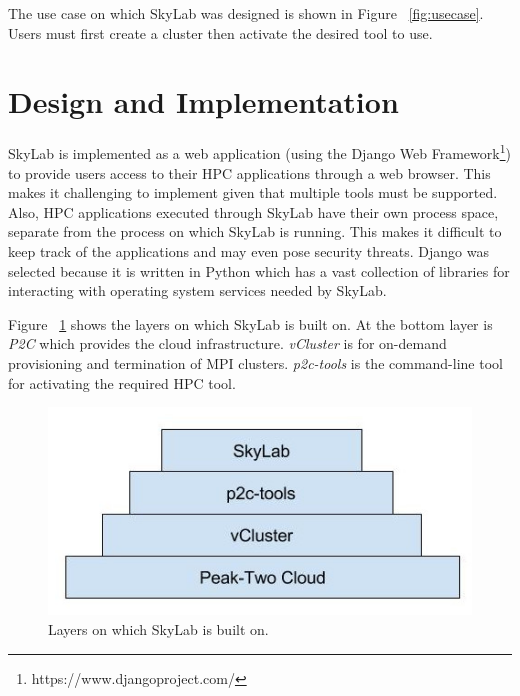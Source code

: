 The use case on which SkyLab was designed is shown in Figure ~\ref{fig:usecase}. Users must first create a cluster then activate the desired tool to use.
      
\section{Design and Implementation}

SkyLab is implemented as a web application (using the Django Web Framework\footnote{https://www.djangoproject.com/}) to provide users access to their HPC applications through a web browser. This makes it challenging to implement given that multiple tools must be supported. Also, HPC applications executed through SkyLab have their own process space, separate from the process on which SkyLab is running. This makes it difficult to keep track of the applications and may even pose security threats. Django was selected because it is written in Python which has a vast collection of libraries for interacting with operating system services needed by SkyLab.

Figure ~\ref{fig:sysarch} shows the layers on which SkyLab is built on. At the bottom layer is \textit{P2C} which provides the cloud infrastructure. \textit{vCluster} is for on-demand provisioning and termination of MPI clusters. \textit{p2c-tools} is the command-line tool for activating the required HPC tool.

	\begin{figure}[h]			
		\includegraphics[scale=0.30]{./images/skylab_layers.jpg}			
		\caption{\label{fig:sysarch}Layers on which SkyLab is built on.}	
	\end{figure}	


